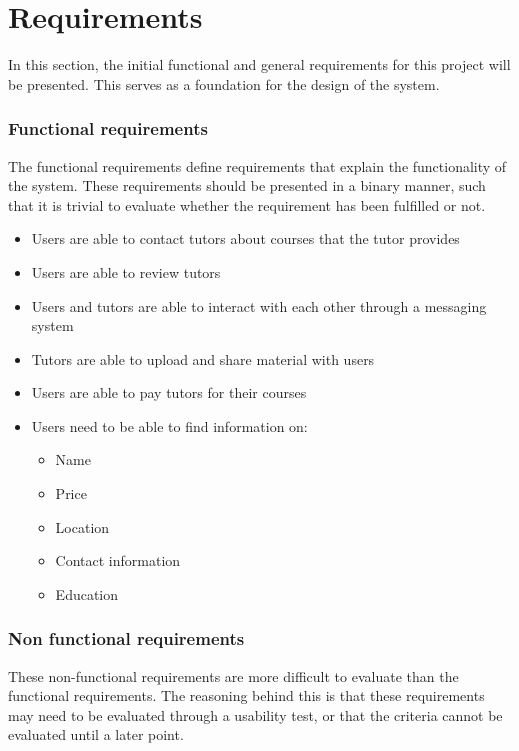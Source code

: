\section{Requirements}
In this section, the initial functional and general requirements for this project will be presented.
This serves as a foundation for the design of the system.

\subsubsection{Functional requirements}
The functional requirements define requirements that explain the functionality of the system. 
These requirements should be presented in a binary manner, such that it is trivial to evaluate whether the requirement has been fulfilled or not.

\begin{itemize}
    \item Users are able to contact tutors about courses that the tutor provides
    \item Users are able to review tutors
    \item Users and tutors are able to interact with each other through a messaging system
    \item Tutors are able to upload and share material with users
    \item Users are able to pay tutors for their courses
    \item Users need to be able to find information on:
    \begin{itemize}
        \item Name
        \item Price
        \item Location
        \item Contact information
        \item Education
    \end{itemize}
\end{itemize}

\subsubsection{Non functional requirements}
These non-functional requirements are more difficult to evaluate than the functional requirements.
The reasoning behind this is that these requirements may need to be evaluated through a usability test, or that the criteria cannot be evaluated until a later point. 


